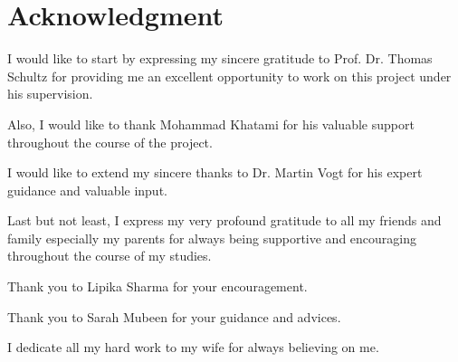 \documentclass[../structure.tex]{subfiles}
\begin{document}
\chapter*{Acknowledgment}

\quad I would like to start by expressing my sincere gratitude to Prof. Dr. Thomas Schultz 
for providing me an excellent opportunity to work on this project under his supervision.

Also, I would like to thank Mohammad Khatami for his valuable support throughout the course of the project.

I would like to extend my sincere thanks to Dr. Martin Vogt for his expert guidance and valuable input.

Last but not least, I express my very profound gratitude to all my friends
and family especially my parents for always being supportive and encouraging throughout the course of my studies.

Thank you to Lipika Sharma for your encouragement.

Thank you to Sarah Mubeen for your guidance and advices.

I dedicate all my hard work to my wife for always believing on me.
\end{document}
